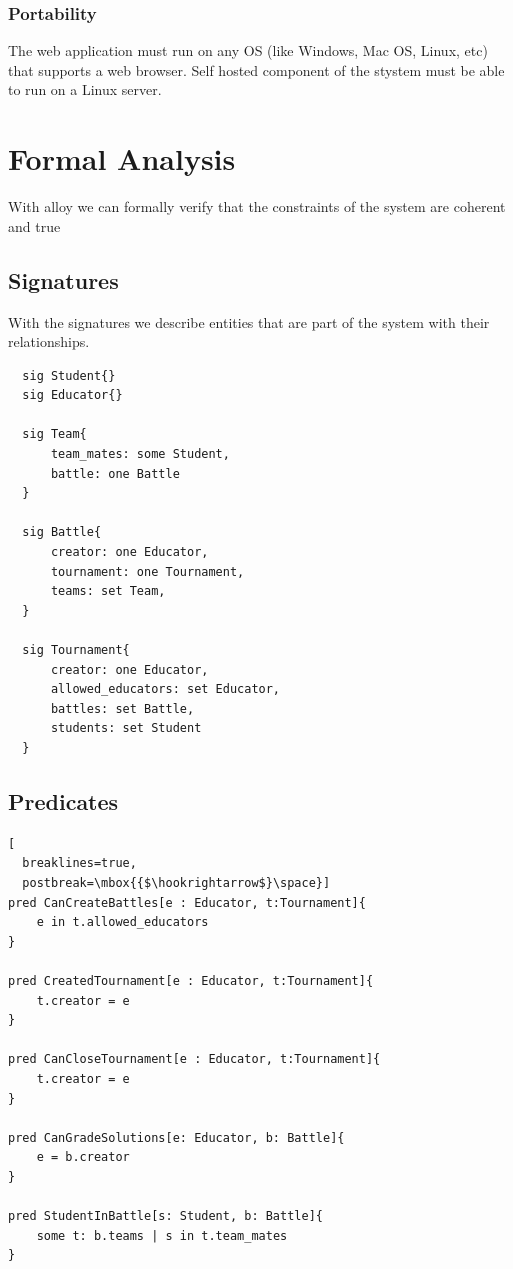 \documentclass{article}
\begin{document}
\subsubsection{Portability}			
The web application must run on any OS (like Windows, Mac OS, Linux, etc) that supports a web browser.
Self hosted component of the stystem must be able to run on a Linux server.

\newpage
\section{Formal Analysis}
With alloy we can formally verify that the constraints of the system are coherent and true

\subsection{Signatures}
With the signatures we describe entities that are part of the system with their relationships.
\begin{lstlisting}
  sig Student{}
  sig Educator{}
  
  sig Team{
      team_mates: some Student,
      battle: one Battle
  }
  
  sig Battle{
      creator: one Educator,
      tournament: one Tournament,
      teams: set Team,
  }
  
  sig Tournament{
      creator: one Educator,
      allowed_educators: set Educator,
      battles: set Battle,
      students: set Student
  }
\end{lstlisting}

\subsection{Predicates}
\begin{lstlisting}[
  breaklines=true,
  postbreak=\mbox{{$\hookrightarrow$}\space}]
pred CanCreateBattles[e : Educator, t:Tournament]{
    e in t.allowed_educators
}

pred CreatedTournament[e : Educator, t:Tournament]{
    t.creator = e
}

pred CanCloseTournament[e : Educator, t:Tournament]{
    t.creator = e
}

pred CanGradeSolutions[e: Educator, b: Battle]{
    e = b.creator
}

pred StudentInBattle[s: Student, b: Battle]{
    some t: b.teams | s in t.team_mates
}
\end{lstlisting}
\end{document}

